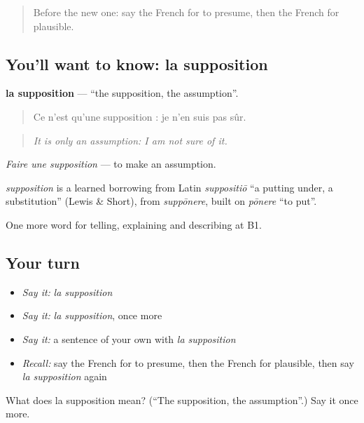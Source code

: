 \label{lesson:FR-C367-supposition}



\begin{quote}
Before the new one: say the French for to presume, then the French for plausible.
\end{quote}

\subsection*{You'll want to know: la supposition}
\textbf{la supposition} — \textquotedblleft{}the supposition, the assumption\textquotedblright{}.

\begin{quote}
Ce n'est qu'une supposition : je n'en suis pas sûr.
\end{quote}

\begin{quote}
\emph{It is only an assumption: I am not sure of it.}
\end{quote}

\emph{Faire une supposition} — to make an assumption.

\begin{cousinweb}
\emph{supposition} is a learned borrowing from Latin \emph{suppositiō} \textquotedblleft{}a putting under, a substitution\textquotedblright{} (Lewis \& Short), from \emph{suppōnere}, built on \emph{pōnere} \textquotedblleft{}to put\textquotedblright{}.
\end{cousinweb}

\begin{grammarlens}[title={What you've built}]
One more word for telling, explaining and describing at B1.
\end{grammarlens}

\subsection*{Your turn}
\begin{itemize}
\raggedright
  \item \emph{Say it:} \emph{la supposition}
  \item \emph{Say it:} \emph{la supposition}, once more
  \item \emph{Say it:} a sentence of your own with \emph{la supposition}
  \item \emph{Recall:} say the French for to presume, then the French for plausible, then say \emph{la supposition} again
\end{itemize}

\begin{tcolorbox}[breakable,colback=teal!4,colframe=teal!35!black,title={Before you move on}]
What does la supposition mean? (\textquotedblleft{}The supposition, the assumption\textquotedblright{}.) Say it once more.
\end{tcolorbox}
